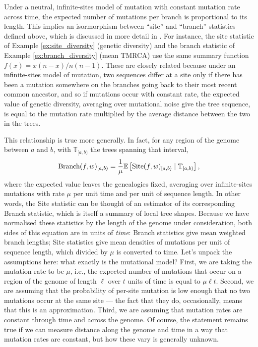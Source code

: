 \documentclass{article}
\newcommand{\branch}{\mbox{Branch}} %
\newcommand{\site}{\mbox{Site}} %
\newcommand{\given}{\;\vert\;}
\newcommand{\treeseq}{\mathbb{T}} %
\newcommand{\iw}{w} %
\begin{document}
Under a neutral, infinite-sites model of mutation with constant mutation rate across time,
the expected number of mutations per branch is proportional to its length.
This implies an isormorphism between ``site'' and ``branch'' statistics defined above,
which is discussed in more detail in \citet{ralph2019empirical}.
For instance, the site statistic of Example \ref{ex:site_diversity} (genetic diversity)
and the branch statistic of Example \ref{ex:branch_diversity} (mean TMRCA)
use the same summary function $f(x) = x(n-x)/n(n-1)$.
These are closely related because under an infinite-sites model of mutation,
two sequences differ at a site only if there has been a mutation somewhere on the branches going back
to their most recent common ancestor,
and so if mutations occur with constant rate,
the expected value of genetic diversity,
averaging over mutational noise give the tree sequence,
is equal to the mutation rate multiplied by the average distance between the two in the trees.

This relationship is true more generally.
In fact, for any region of the genome between $a$ and $b$,
with $\treeseq_{[a,b)}$ the trees spanning that interval,
\begin{align}
    \branch(f, \iw)_{[a,b)}
    =
    \frac{1}{\mu}
    \E\left[ \site(f, \iw)_{[a,b)} \given \treeseq_{[a,b)} \right] ,
\end{align}
where the expected value leaves the genealogies fixed,
averaging over infinite-sites mutations
with rate $\mu$ per unit time and per unit of sequence length.
In other words, the Site statistic can be thought of an estimator of its corresponding Branch statistic,
which is itself a summary of local tree shapes.
Because we have normalised these statistics by the length of the genome under consideration,
both sides of this equation are in units of \emph{time}:
Branch statistics give mean weighted branch lengths;
Site statistics give mean densities of mutations per unit of sequence length,
which divided by $\mu$ is converted to time.
Let's unpack the assumptions here: what exactly is the mutational model?
First, we are taking the mutation rate to be $\mu$, i.e.,
the expected number of mutations that occur on a region of the genome of length $\ell$
over $t$ units of time is equal to $\mu \ell t$.
Second, we are assuming that the probability of per-site mutation is low enough
that no two mutations occur at the same site
--- the fact that they do, occasionally, means that this is an approximation.
Third, we are assuming that mutation rates are constant through time and across the genome.
Of course, the statement remains true if we can measure distance along the genome and time
in a way that mutation rates are constant, but how these vary is generally unknown.
\end{document}

